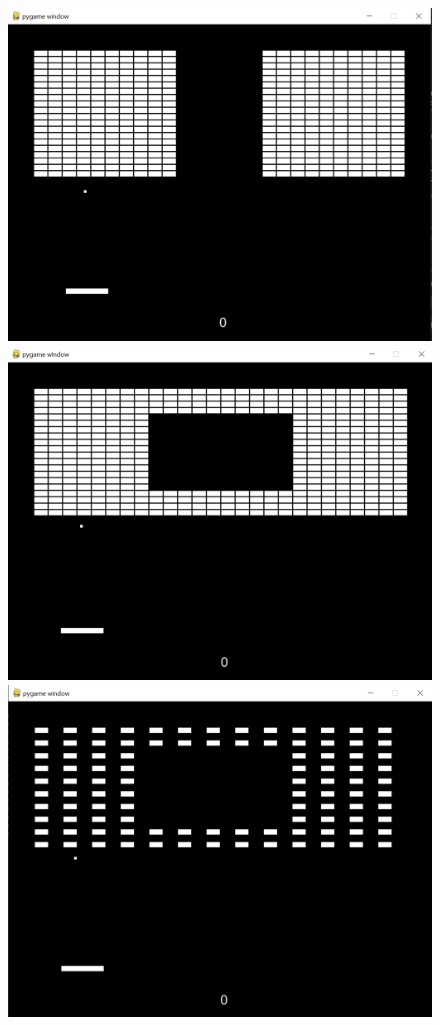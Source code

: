 \documentclass[twoside,11pt]{article}
\begin{document}
\begin{figure}[H]
\includegraphics[scale=0.2]{layout5}
\includegraphics[scale=0.2]{layout6}
\includegraphics[scale=0.2]{layout7}
\centering
\end{figure}
\end{document}
